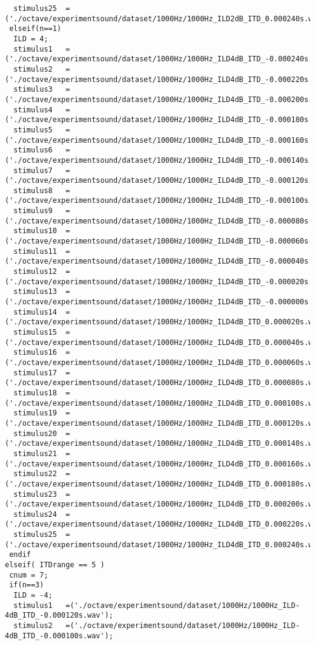 {\begin{verbatim}
  stimulus25  =('./octave/experimentsound/dataset/1000Hz/1000Hz_ILD2dB_ITD_0.000240s.wav');
 elseif(n==1)
  ILD = 4;
  stimulus1   =('./octave/experimentsound/dataset/1000Hz/1000Hz_ILD4dB_ITD_-0.000240s.wav');
  stimulus2   =('./octave/experimentsound/dataset/1000Hz/1000Hz_ILD4dB_ITD_-0.000220s.wav');
  stimulus3   =('./octave/experimentsound/dataset/1000Hz/1000Hz_ILD4dB_ITD_-0.000200s.wav');
  stimulus4   =('./octave/experimentsound/dataset/1000Hz/1000Hz_ILD4dB_ITD_-0.000180s.wav');
  stimulus5   =('./octave/experimentsound/dataset/1000Hz/1000Hz_ILD4dB_ITD_-0.000160s.wav');
  stimulus6   =('./octave/experimentsound/dataset/1000Hz/1000Hz_ILD4dB_ITD_-0.000140s.wav');
  stimulus7   =('./octave/experimentsound/dataset/1000Hz/1000Hz_ILD4dB_ITD_-0.000120s.wav');
  stimulus8   =('./octave/experimentsound/dataset/1000Hz/1000Hz_ILD4dB_ITD_-0.000100s.wav');
  stimulus9   =('./octave/experimentsound/dataset/1000Hz/1000Hz_ILD4dB_ITD_-0.000080s.wav');
  stimulus10  =('./octave/experimentsound/dataset/1000Hz/1000Hz_ILD4dB_ITD_-0.000060s.wav');
  stimulus11  =('./octave/experimentsound/dataset/1000Hz/1000Hz_ILD4dB_ITD_-0.000040s.wav');
  stimulus12  =('./octave/experimentsound/dataset/1000Hz/1000Hz_ILD4dB_ITD_-0.000020s.wav');
  stimulus13  =('./octave/experimentsound/dataset/1000Hz/1000Hz_ILD4dB_ITD_-0.000000s.wav');
  stimulus14  =('./octave/experimentsound/dataset/1000Hz/1000Hz_ILD4dB_ITD_0.000020s.wav');
  stimulus15  =('./octave/experimentsound/dataset/1000Hz/1000Hz_ILD4dB_ITD_0.000040s.wav');
  stimulus16  =('./octave/experimentsound/dataset/1000Hz/1000Hz_ILD4dB_ITD_0.000060s.wav');
  stimulus17  =('./octave/experimentsound/dataset/1000Hz/1000Hz_ILD4dB_ITD_0.000080s.wav');
  stimulus18  =('./octave/experimentsound/dataset/1000Hz/1000Hz_ILD4dB_ITD_0.000100s.wav');
  stimulus19  =('./octave/experimentsound/dataset/1000Hz/1000Hz_ILD4dB_ITD_0.000120s.wav');
  stimulus20  =('./octave/experimentsound/dataset/1000Hz/1000Hz_ILD4dB_ITD_0.000140s.wav');
  stimulus21  =('./octave/experimentsound/dataset/1000Hz/1000Hz_ILD4dB_ITD_0.000160s.wav');
  stimulus22  =('./octave/experimentsound/dataset/1000Hz/1000Hz_ILD4dB_ITD_0.000180s.wav');
  stimulus23  =('./octave/experimentsound/dataset/1000Hz/1000Hz_ILD4dB_ITD_0.000200s.wav');
  stimulus24  =('./octave/experimentsound/dataset/1000Hz/1000Hz_ILD4dB_ITD_0.000220s.wav');
  stimulus25  =('./octave/experimentsound/dataset/1000Hz/1000Hz_ILD4dB_ITD_0.000240s.wav');
 endif
elseif( ITDrange == 5 )
 cnum = 7;
 if(n==3)
  ILD = -4;
  stimulus1   =('./octave/experimentsound/dataset/1000Hz/1000Hz_ILD-4dB_ITD_-0.000120s.wav');
  stimulus2   =('./octave/experimentsound/dataset/1000Hz/1000Hz_ILD-4dB_ITD_-0.000100s.wav');

\end{verbatim}}
